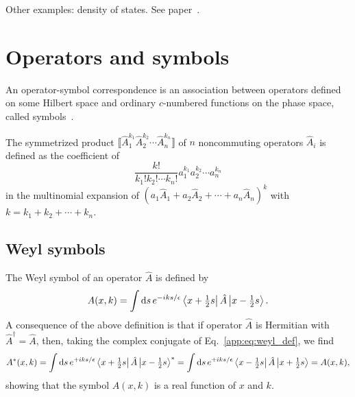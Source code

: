 Other examples: density of states.  See paper~\cite{gillespie1983}.

\section{Operators and symbols}

An operator-symbol correspondence is an association between operators defined on some Hilbert space and ordinary $c$-numbered functions on the phase space, called symbols~\cite[\S 2.3.1]{chaichian2001}.

The symmetrized product $\big\llbracket \hat{A}_{1}^{k_{1}} \hat{A}_{2}^{k_{2}} \cdots \hat{A}_{n}^{k_n} \big\rrbracket$ of $n$ noncommuting operators $\hat{A}_{i}$ is defined as the coefficient of
%
\begin{equation}
  \frac{k!}{k_{1}!k_{2}!\cdots k_{n}!} a_{1}^{k_{1}} a_{2}^{k_{2}} \cdots a_{n}^{k_{n}}
\end{equation}
%
in the multinomial expansion of $\left(a_{1}\hat{A}_{1} + a_{2}\hat{A}_{2} + \cdots + a_{n}\hat{A}_{n}\right)^{k}$ with $k = k_{1} + k_{2} + \cdots + k_{n}$.

\subsection{Weyl symbols}

The Weyl symbol of an operator $\hat{A}$ is defined by
%
\begin{equation}
  A(x, k) = \int \mathrm{d}{s}\, e^{-iks/\epsilon} \left\langle x + \tfrac{1}{2}s\right|\hat{A}\left|x - \tfrac{1}{2}s\right\rangle.
  \label{app:eq:weyl_def}
\end{equation}
%
A consequence of the above definition is that if operator $\hat{A}$ is Hermitian with $\hat{A}^{\dagger} = \hat{A}$, then, taking the complex conjugate of Eq.~\eqref{app:eq:weyl_def}, we find
%
\begin{equation}
  A^{*}(x, k) = \int \mathrm{d}{s}\, e^{+iks/\epsilon} \left\langle x + \tfrac{1}{2}s\right|\hat{A}\left|x - \tfrac{1}{2}s\right\rangle^{*}
  = \int \mathrm{d}{s}\, e^{+iks/\epsilon} \left\langle x - \tfrac{1}{2}s\right|\hat{A}\left|x + \tfrac{1}{2}s\right\rangle = A(x, k),
\end{equation}
%
showing that the symbol $A(x, k)$ is a real function of $x$ and $k$.

